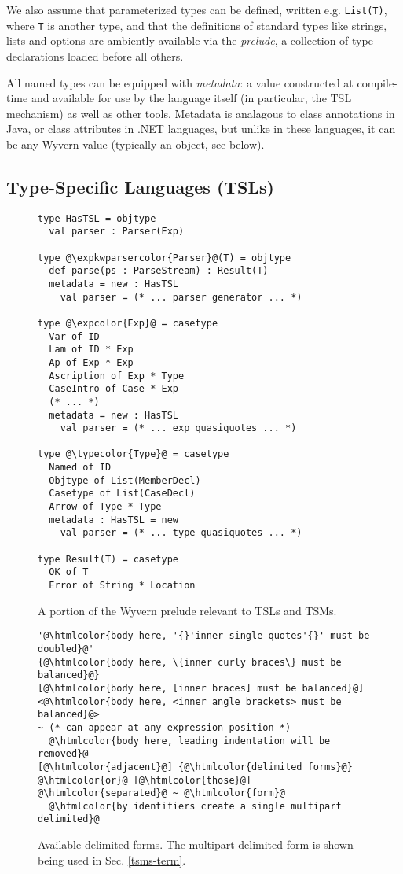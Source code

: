 \documentclass{sig-alternate}
\newcommand{\htmlcolor}[1]{\textcolor[HTML]{339933}{#1}}
\newcommand{\expkwparsercolor}[1]{\textcolor[HTML]{336699}{#1}}
\newcommand{\expcolor}[1]{\textcolor[HTML]{FF0033}{#1}}
\newcommand{\typecolor}[1]{\textcolor[HTML]{660066}{#1}}
\newcommand{\mycaption}[1]{\vspace{-4px}\caption{#1}\vspace{-2px}}
\begin{document}
We also assume that parameterized types can be defined, written e.g. \verb|List(T)|, where \verb|T| is another type, and that the definitions of standard  types like strings, lists and options are ambiently available via the \emph{prelude}, a collection of type declarations loaded before all others. 

All named types can be equipped with \emph{metadata}: a value constructed at compile-time and available for use by the language itself (in particular, the TSL mechanism) as well as other tools. Metadata is analagous to class annotations in Java, or class attributes in .NET languages, but unlike in these languages, it can be any Wyvern value (typically an object, see below).%

\subsection{Type-Specific Languages (TSLs)}


\begin{figure}[t!]
\begin{lstlisting}[style=wyvern]
type HasTSL = objtype
  val parser : Parser(Exp)

type @\expkwparsercolor{Parser}@(T) = objtype
  def parse(ps : ParseStream) : Result(T)
  metadata = new : HasTSL
    val parser = (* ... parser generator ... *)

type @\expcolor{Exp}@ = casetype
  Var of ID
  Lam of ID * Exp
  Ap of Exp * Exp
  Ascription of Exp * Type
  CaseIntro of Case * Exp
  (* ... *)
  metadata = new : HasTSL
    val parser = (* ... exp quasiquotes ... *)

type @\typecolor{Type}@ = casetype
  Named of ID
  Objtype of List(MemberDecl)
  Casetype of List(CaseDecl)
  Arrow of Type * Type
  metadata : HasTSL = new
    val parser = (* ... type quasiquotes ... *)

type Result(T) = casetype
  OK of T
  Error of String * Location
\end{lstlisting}
\mycaption{A portion of the Wyvern prelude relevant to TSLs and TSMs.}
\label{exp-prelude}
\end{figure}
\begin{figure}[t]
\begin{lstlisting}[style=tempwyvern]
'@\htmlcolor{body here, '{}'inner single quotes'{}' must be doubled}@'
{@\htmlcolor{body here, \{inner curly braces\} must be balanced}@}
[@\htmlcolor{body here, [inner braces] must be balanced}@]
<@\htmlcolor{body here, <inner angle brackets> must be balanced}@>
~ (* can appear at any expression position *)
  @\htmlcolor{body here, leading indentation will be removed}@
[@\htmlcolor{adjacent}@] {@\htmlcolor{delimited forms}@} @\htmlcolor{or}@ [@\htmlcolor{those}@] @\htmlcolor{separated}@ ~ @\htmlcolor{form}@
  @\htmlcolor{by identifiers create a single multipart delimited}@
\end{lstlisting}
\mycaption{Available delimited forms. The multipart delimited form is shown being used in Sec. \ref{tsms-term}.}
\label{f-delimited}
\end{figure}
\end{document}
